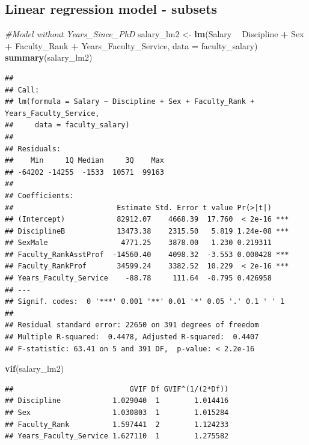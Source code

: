 \documentclass[]{article}
\newenvironment{Shaded}{\begin{snugshade}}{\end{snugshade}}
\newcommand{\KeywordTok}[1]{\textcolor[rgb]{0.13,0.29,0.53}{\textbf{#1}}}
\newcommand{\DataTypeTok}[1]{\textcolor[rgb]{0.13,0.29,0.53}{#1}}
\newcommand{\StringTok}[1]{\textcolor[rgb]{0.31,0.60,0.02}{#1}}
\newcommand{\CommentTok}[1]{\textcolor[rgb]{0.56,0.35,0.01}{\textit{#1}}}
\newcommand{\OperatorTok}[1]{\textcolor[rgb]{0.81,0.36,0.00}{\textbf{#1}}}
\newcommand{\NormalTok}[1]{#1}
\begin{document}
\subsection{Linear regression model -
subsets}\label{linear-regression-model---subsets}

\begin{Shaded}
\begin{Highlighting}[]
\CommentTok{#Model without Years_Since_PhD }
\NormalTok{salary_lm2 <-}\StringTok{ }\KeywordTok{lm}\NormalTok{(Salary }\OperatorTok{~}\StringTok{ }\NormalTok{Discipline }\OperatorTok{+}\StringTok{ }\NormalTok{Sex }\OperatorTok{+}\StringTok{ }\NormalTok{Faculty_Rank }\OperatorTok{+}\StringTok{ }\NormalTok{Years_Faculty_Service, }\DataTypeTok{data =}\NormalTok{ faculty_salary)}
\KeywordTok{summary}\NormalTok{(salary_lm2)}
\end{Highlighting}
\end{Shaded}

\begin{verbatim}
## 
## Call:
## lm(formula = Salary ~ Discipline + Sex + Faculty_Rank + Years_Faculty_Service, 
##     data = faculty_salary)
## 
## Residuals:
##    Min     1Q Median     3Q    Max 
## -64202 -14255  -1533  10571  99163 
## 
## Coefficients:
##                        Estimate Std. Error t value Pr(>|t|)    
## (Intercept)            82912.07    4668.39  17.760  < 2e-16 ***
## DisciplineB            13473.38    2315.50   5.819 1.24e-08 ***
## SexMale                 4771.25    3878.00   1.230 0.219311    
## Faculty_RankAsstProf  -14560.40    4098.32  -3.553 0.000428 ***
## Faculty_RankProf       34599.24    3382.52  10.229  < 2e-16 ***
## Years_Faculty_Service    -88.78     111.64  -0.795 0.426958    
## ---
## Signif. codes:  0 '***' 0.001 '**' 0.01 '*' 0.05 '.' 0.1 ' ' 1
## 
## Residual standard error: 22650 on 391 degrees of freedom
## Multiple R-squared:  0.4478, Adjusted R-squared:  0.4407 
## F-statistic: 63.41 on 5 and 391 DF,  p-value: < 2.2e-16
\end{verbatim}

\begin{Shaded}
\begin{Highlighting}[]
\KeywordTok{vif}\NormalTok{(salary_lm2)}
\end{Highlighting}
\end{Shaded}

\begin{verbatim}
##                           GVIF Df GVIF^(1/(2*Df))
## Discipline            1.029040  1        1.014416
## Sex                   1.030803  1        1.015284
## Faculty_Rank          1.597441  2        1.124233
## Years_Faculty_Service 1.627110  1        1.275582
\end{verbatim}
\end{document}
